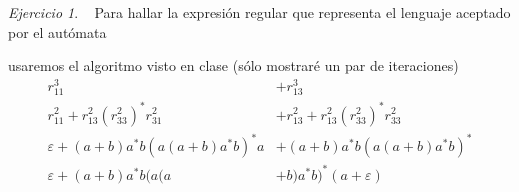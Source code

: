 \documentclass[12pt,spanish]{article}
\theoremstyle{definition}
\theoremstyle{remark}
\newtheorem{exercise}{Ejercicio}%
\begin{document}
\setcounter{exercise}{21}
\begin{exercise}~ Para hallar la expresión regular que representa el lenguaje aceptado por el autómata \vspace{-5mm}
\begin{figure}[H]
  \centering
\end{figure} \vspace{-5mm}
usaremos el algoritmo visto en clase (sólo mostraré un par de iteraciones)
\begin{align*}
  r_{11}^3&+r_{13}^3 \\
  r_{11}^2+r_{13}^2(r_{33}^2)^*r_{31}^2&+r_{13}^2+r_{13}^2(r_{33}^2)^*r_{33}^2 \\
  \varepsilon+(a+b)a^*b(a(a+b)a^*b)^*a&+(a+b)a^*b(a(a+b)a^*b)^* \\
  \varepsilon+(a+b)a^*b(a(a&+b)a^*b)^*(a+\varepsilon)
\end{align*}
\end{exercise}
\end{document}

